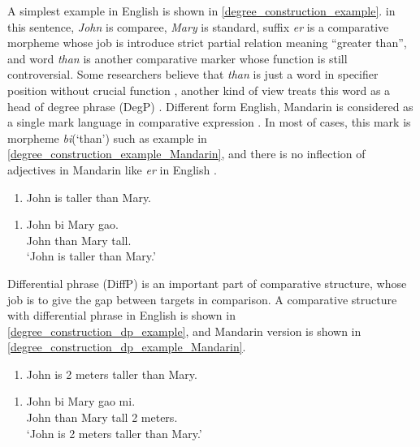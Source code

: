 \documentclass{ctexart}
\let \cite \parencite
\begin{document}
A simplest example in English is shown in \ref{degree_construction_example}. in this sentence, \textit{John} is comparee, \textit{Mary} is standard, suffix \textit{er} is a comparative morpheme whose job is introduce strict partial relation meaning ``greater than'', and word \textit{than} is another comparative marker whose function is still controversial. Some researchers believe that \textit{than} is just a word in specifier position without crucial function \cite{von1984a,heim1985,bhatt2004,rullmann1995}, another kind of view treats this word as a head of degree phrase (DegP) \cite{bierwisch1989,corver1990,corver1993,corver1997a,kennedy1997,grano2012}. Different form English, Mandarin is considered as a single mark language in comparative expression \cite{bobaljik2012,grano2012}. In most of cases, this mark is morpheme \textit{bi}(`than') such as example in \ref{degree_construction_example_Mandarin}, and there is no inflection of adjectives in Mandarin like \textit{er} in English \cite{guo2012}. 

\begin{enumerate}
    \item \label{degree_construction_example}
    John is taller than Mary.
\end{enumerate}

\begin{enumerate}
    \item \label{degree_construction_example_Mandarin}
    John \enspace bi \enspace Mary \enspace gao.  \\
    John than Mary \enspace tall. \\
    `John is taller than Mary.'
\end{enumerate}

Differential phrase (DiffP) is an important part of comparative structure, whose job is to give the gap between targets in comparison. A comparative structure with differential phrase in English is shown in \ref{degree_construction_dp_example}, and Mandarin version is shown in \ref{degree_construction_dp_example_Mandarin}.

\begin{enumerate}
    \item \label{degree_construction_dp_example}
    John is 2 meters taller than Mary.
\end{enumerate}

\begin{enumerate}
    \item \label{degree_construction_dp_example_Mandarin}
    John \enspace bi \enspace Mary \enspace gao  mi.  \\
    John than Mary \enspace tall 2 meters. \\
    `John is 2 meters taller than Mary.'
\end{enumerate}
\end{document}

